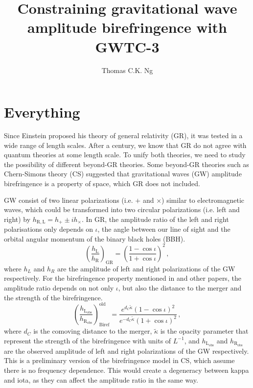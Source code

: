 \documentclass[twocolumn]{aastex631}
\begin{document}
\title{Constraining gravitational wave amplitude birefringence with GWTC-3}

\author{Thomas C.K. Ng}

\begin{abstract}
    
\end{abstract}

\section{Everything}
Since Einstein proposed his theory of general relativity (GR), it was tested in a wide range of length scales.
After a century, we know that GR do not agree with quantum theories at some length scale.
To unify both theories, we need to study the possibility of different beyond-GR theories.
Some beyond-GR theories such as Chern-Simons theory (CS) suggested that gravitational waves (GW) amplitude birefringence is a property of space, which GR does not included.

GW consist of two linear polarizations (i.e. $+$ and $\times$) similar to electromagnetic waves, which could be transformed into two circular polarizations (i.e. left and right) by $h_{\mathrm{R}, \mathrm{L}} = h_+ \pm i h_\times$.
In GR, the amplitude ratio of the left and right polarisations only depends on $\iota$, the angle between our line of sight and the orbital angular momentum of the binary black holes (BBH).
\begin{equation}
    \left(\frac{h_\mathrm{L}}{h_\mathrm{R}}\right)_\mathrm{GR}=\left(\frac{1-\cos\iota}{1+\cos\iota}\right)^2\,,
\end{equation}where $h_L$ and $h_R$ are the amplitude of left and right polarizations of the GW respectively.
For the birefringence property mentioned in \citet{Maria_2021} and other papers, the amplitude ratio depends on not only $\iota$, but also the distance to the merger and the strength of the birefringence.
\begin{equation}
    \left(\frac{h_\mathrm{L_{obs}}}{h_\mathrm{R_{obs}}}\right)_\mathrm{Biref}^\mathrm{old}=\frac{e^{d_C\widetilde{\kappa}}\left(1-\cos\iota\right)^2}{e^{-d_C\widetilde{\kappa}}\left(1+\cos\iota\right)^2}\,,
\end{equation}where $d_C$ is the comoving distance to the merger, $\widetilde{\kappa}$ is the opacity parameter that represent the strength of the birefringence with units of $L^{-1}$, and $h_\mathrm{L_{obs}}$ and $h_\mathrm{R_{obs}}$ are the observed amplitude of left and right polarizations of the GW respectively.
This is a preliminary version of the birefringence model in CS, which assume there is no frequency dependence.
This would create a degeneracy between kappa and iota, as they can affect the amplitude ratio in the same way.
\end{document}
